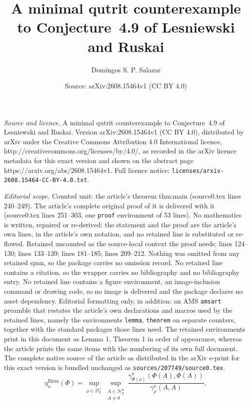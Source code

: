 \documentclass[10pt,a4paper]{amsart}
\title{A minimal qutrit counterexample to Conjecture~4.9 of Lesniewski and Ruskai}
\author{Domingos S. P. Salazar}
\date{Source: arXiv:2608.15464v1 (CC BY 4.0)}
\newcommand{\Dplus}{\mathcal D_d^{+}}
\newcommand{\Htr}{\mathcal H_d^{0}}
\newcommand{\Riem}{\mathrm{Riem}}
\begin{document}
\maketitle

\noindent\emph{Source and licence.} A minimal qutrit counterexample to Conjecture~4.9 of Lesniewski and Ruskai. Version arXiv:2608.15464v1 (CC BY 4.0), distributed by arXiv under the Creative Commons Attribution 4.0 International licence, http://creativecommons.org/licenses/by/4.0/, as recorded in the arXiv licence metadata for this exact version and shown on the abstract page https://arxiv.org/abs/2608.15464v1. Full licence notice: \texttt{licenses/arxiv-2608.15464-CC-BY-4.0.txt}.\par\smallskip

\noindent\textit{Editorial scope.} Counted unit: the article's theorem thm:main (source0.tex lines 240--249). The article's complete original proof of it is delivered with it (source0.tex lines 251--303, one \texttt{proof} environment of 53 lines). No mathematics is written, repaired or re-derived: the statement and the proof are the article's own lines, in the article's own notation, and no retained line is substituted or re-flowed.  Retained uncounted as the source-local context the proof needs: lines 124--130; lines 133--139; lines 181--185; lines 209--212.  Nothing was omitted from any retained span, so the package carries no omission record.  No retained line contains a citation, so the wrapper carries no bibliography and no bibliography entry.  No retained line contains a figure environment, an image-inclusion command or drawing code, so no image is delivered and the package declares no asset dependency.  Editorial formatting only, in addition: an AMS \texttt{amsart} preamble that restates the article's own declarations and macros used by the retained lines, namely the environments \texttt{lemma}, \texttt{theorem} on separate counters, together with the standard packages those lines need.  The retained environments print in this document as Lemma 1, Theorem 1 in order of appearance, whereas the article prints the same items with the numbering of its own full document.  The complete native source of the article as distributed in the arXiv e-print for this exact version is bundled unchanged as \texttt{sources/207749/source0.tex}.
\begin{equation}\label{eq:eta}
 \eta_\kappa^{\Riem}(\Phi)
 =\sup_{\rho\in\Dplus}
  \sup_{\substack{A\in\Htr\\A\ne0}}
 \frac{\gamma_{\Phi(\rho)}^\kappa(\Phi(A),\Phi(A))}
      {\gamma_\rho^\kappa(A,A)},
\end{equation}
\end{document}
